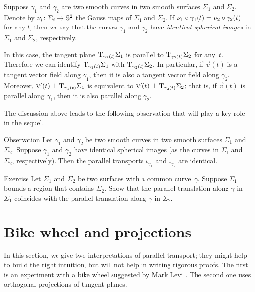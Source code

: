 Suppose $\gamma_1$ and $\gamma_2$ are two smooth curves in two smooth surfaces $\Sigma_1$ and $\Sigma_2$.
Denote by $\nu_i\colon\Sigma_i\to\mathbb{S}^2$ the Gauss maps of $\Sigma_1$ and $\Sigma_2$.
If $\nu_1\circ\gamma_1(t)= \nu_2\circ\gamma_2(t)$ for any $t$, then we say that the curves $\gamma_1$ and $\gamma_2$ have {}\emph{identical spherical images} in $\Sigma_1$ and $\Sigma_2$, respectively.

In this case, the tangent plane $\mathrm{T}_{\gamma_1(t)}\Sigma_1$ is parallel to $\mathrm{T}_{\gamma_2(t)}\Sigma_2$ for any~$t$.
Therefore we can identify $\mathrm{T}_{\gamma_1(t)}\Sigma_1$ with $\mathrm{T}_{\gamma_2(t)}\Sigma_2$.
In particular, if $\vec v(t)$ is a tangent vector field along $\gamma_1$,
then it is also a tangent vector field along $\gamma_2$.
Moreover, $\text{\sc{v}}'(t)\perp \mathrm{T}_{\gamma_1(t)}\Sigma_1$ is equivalent to $\text{\sc{v}}'(t)\perp \mathrm{T}_{\gamma_2(t)}\Sigma_2$; that is, if $\vec v(t)$ is parallel along $\gamma_1$,
then it is also parallel along $\gamma_2$.

The discussion above leads to the following observation that will play a key role in the sequel.

\begin{thm}{Observation}\label{obs:parallel=}
Let $\gamma_1$ and $\gamma_2$ be two smooth curves in two smooth surfaces $\Sigma_1$ and $\Sigma_2$.
Suppose $\gamma_1$ and $\gamma_2$ have identical spherical images (as the curves in $\Sigma_1$ and $\Sigma_2$, respectively).
Then the parallel transports $\iota_{\gamma_1}$ and $\iota_{\gamma_2}$ are identical. 
\end{thm}

\begin{thm}{Exercise}\label{ex:parallel-transport-support}
Let $\Sigma_1$ and $\Sigma_2$ be two surfaces with a common curve~$\gamma$.
Suppose $\Sigma_1$ bounds a region that contains $\Sigma_2$.
Show that the parallel translation along $\gamma$ in $\Sigma_1$ 
coincides with the parallel translation along $\gamma$ in $\Sigma_2$. 
\end{thm}

\section{Bike wheel and projections}

In this section, we give two interpretations of parallel transport;
they might help to build the right intuition, but will not help in writing rigorous proofs.
The first is an experiment with a bike wheel suggested by Mark Levi \cite{levi}.
The second one uses orthogonal projections of tangent planes.

